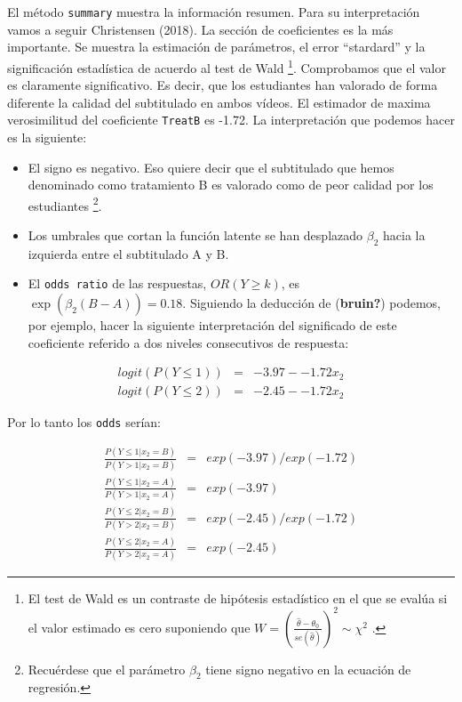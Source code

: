 \documentclass[
  letterpaper,
  DIV=11,
  numbers=noendperiod]{scrartcl}
\begin{document}
El método \texttt{summary} muestra la información resumen. Para su
interpretación vamos a seguir Christensen (2018). La sección de
coeficientes es la más importante. Se muestra la estimación de
parámetros, el error ``stardard'' y la significación estadística de
acuerdo al test de Wald \footnote{El test de Wald es un contraste de
  hipótesis estadístico en el que se evalúa si el valor estimado es cero
  suponiendo que
  \(W = \left(\frac{\hat{\theta} - \theta_0}{se(\hat{\theta})}\right)^2 \sim \chi^{2}\)
  .}. Comprobamos que el valor es claramente significativo. Es decir,
que los estudiantes han valorado de forma diferente la calidad del
subtitulado en ambos vídeos. El estimador de maxima verosimilitud del
coeficiente \texttt{TreatB} es -1.72. La interpretación que podemos
hacer es la siguiente:

\begin{itemize}
\item
  El signo es negativo. Eso quiere decir que el subtitulado que hemos
  denominado como tratamiento B es valorado como de peor calidad por los
  estudiantes \footnote{Recuérdese que el parámetro \(\beta_2\) tiene
    signo negativo en la ecuación de regresión.}.
\item
  Los umbrales que cortan la función latente se han desplazado
  \(\beta_2\) hacia la izquierda entre el subtitulado A y B.
\item
  El \texttt{odds\ ratio} de las respuestas, \(OR(Y \geq k)\), es
  \(\exp(\widehat{\beta_2}(B - A)) = 0.18\). Siguiendo la deducción de
  (\textbf{bruin?}) podemos, por ejemplo, hacer la siguiente
  interpretación del significado de este coeficiente referido a dos
  niveles consecutivos de respuesta:
\end{itemize}

\[
\begin{aligned}
logit (P(Y \le 1)) & = & -3.97 - -1.72 x_2 \\
logit (P(Y \le 2)) & = & -2.45 - -1.72 x_2
\end{aligned}
\]

Por lo tanto los \texttt{odds} serían:

\[
\begin{aligned}
\frac{P(Y \le 1 | x_2 = B)}{P(Y \gt 1 | x_2 = B)} & = & exp(-3.97)/exp(-1.72) \\
\frac{P(Y \le 1 | x_2 = A)}{P(Y \gt 1 | x_2 = A)} & = & exp(-3.97) \\
\frac{P(Y \le 2 | x_2 = B)}{P(Y \gt 2 | x_2 = B)} & = & exp(-2.45)/exp(-1.72) \\
\frac{P(Y \le 2 | x_2 = A)}{P(Y \gt 2 | x_2 = A)} & = & exp(-2.45)
\end{aligned}
\]
\end{document}
